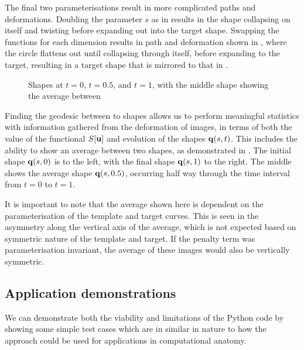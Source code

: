 \documentclass[a4paper, 12pt]{article}
\begin{document}
The final two parameterisations result in more complicated paths and
deformations. Doubling the parameter $s$ as in  results in the shape
collapsing on itself and twisting before expanding out into the target
shape. Swapping the functions for each dimension results in path and deformation
shown in , where the circle flattens out until collapsing through itself, before
expanding to the target, resulting in a target shape that is mirrored to that in
.

\begin{figure}[h!]
  \centering
  \caption[Average shape between a template and target]{Shapes at $t=0$, $t=0.5$, and $t=1$, with the middle shape
    showing the average between}
\label{fig:average}
\end{figure}

Finding the geodesic between to shapes allows us to perform meaningful statistics with
information gathered from the deformation of images, in terms of both the value of
the functional $S[\mathbf{u}]$ and evolution of the shapes $\mathbf{q}(s,t)$. This
includes the ability to show an average between two shapes, as
demonstrated in . The initial shape $\mathbf{q}(s,0)$ is to the left,
with the final shape $\mathbf{q}(s,1)$ to the right. The middle shows the average
shape $\mathbf{q}(s,0.5)$, occurring half way through the time interval from $t=0$
to $t=1$. 

It is important to note that the average shown here is  dependent on
the parameterisation of the template and target curves. This is seen in the
asymmetry along the vertical axis of the average, which is not expected based on
symmetric nature of the template and target. If the penalty term was
parameterisation invariant, the average of these images would also be
vertically symmetric.


\subsection{Application demonstrations}

We can demonstrate both the viability and limitations of the Python code
by showing some simple test cases which are in similar in nature to how the
approach could be used for applications in computational anatomy.
\end{document}
